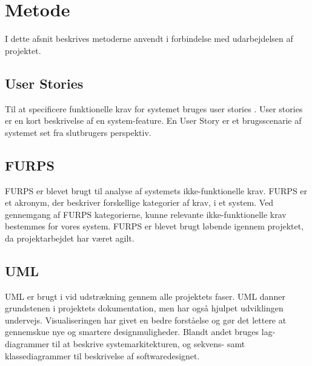 \chapter{Metode}
I dette afsnit beskrives metoderne anvendt i forbindelse med udarbejdelsen af projektet.

\section{User Stories}
Til at specificere funktionelle krav for systemet bruges user stories \cite{margaretrouse2015}. User stories er en kort beskrivelse af en system-feature. En User Story er et brugsscenarie af systemet set fra slutbrugers perspektiv.

\section{FURPS}
FURPS er blevet brugt til analyse af systemets ikke-funktionelle krav. FURPS er et akronym, der beskriver forskellige kategorier af krav, i et system. Ved gennemgang af FURPS kategorierne, kunne relevante ikke-funktionelle krav bestemmes for vores system. FURPS er blevet brugt løbende igennem projektet, da projektarbejdet har været agilt.

\section{UML}
UML er brugt i vid udstrækning gennem alle projektets faser. UML danner grundstenen i projektets dokumentation, men har også hjulpet udviklingen undervejs. Visualiseringen har givet en bedre forståelse og gør det lettere at gennemskue nye og smartere designmuligheder. Blandt andet bruges lag-diagrammer til at beskrive systemarkitekturen, og sekvens- samt klassediagrammer til beskrivelse af softwaredesignet.



